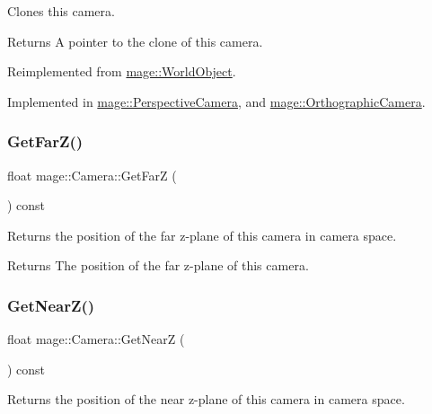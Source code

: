 Clones this camera.

\begin{DoxyReturn}{Returns}
A pointer to the clone of this camera. 
\end{DoxyReturn}


Reimplemented from \hyperlink{classmage_1_1_world_object_a8793d22cb63b1bd31b1307e5e7094f61}{mage\+::\+World\+Object}.



Implemented in \hyperlink{classmage_1_1_perspective_camera_a08eebf7f3ba10a46b4b23c0ded1192f2}{mage\+::\+Perspective\+Camera}, and \hyperlink{classmage_1_1_orthographic_camera_ae075c08e4af88f74212bf5c84d2e5b2a}{mage\+::\+Orthographic\+Camera}.

\hypertarget{classmage_1_1_camera_a7f293a8711086b3419fe3b4224ff2778}{}\label{classmage_1_1_camera_a7f293a8711086b3419fe3b4224ff2778} 
\subsubsection{\texorpdfstring{Get\+Far\+Z()}{GetFarZ()}}
{\footnotesize\ttfamily float mage\+::\+Camera\+::\+Get\+FarZ (\begin{DoxyParamCaption}{ }\end{DoxyParamCaption}) const}

Returns the position of the far z-\/plane of this camera in camera space.

\begin{DoxyReturn}{Returns}
The position of the far z-\/plane of this camera. 
\end{DoxyReturn}
\hypertarget{classmage_1_1_camera_a175e3c36526a8a3e28cd2f8bd1701c55}{}\label{classmage_1_1_camera_a175e3c36526a8a3e28cd2f8bd1701c55} 
\subsubsection{\texorpdfstring{Get\+Near\+Z()}{GetNearZ()}}
{\footnotesize\ttfamily float mage\+::\+Camera\+::\+Get\+NearZ (\begin{DoxyParamCaption}{ }\end{DoxyParamCaption}) const}

Returns the position of the near z-\/plane of this camera in camera space.

